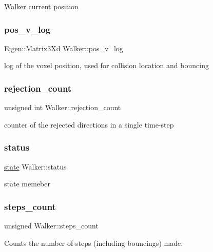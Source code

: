 \hyperlink{class_walker}{Walker} current position \mbox{\label{class_walker_a62d99cc92226681123be94e64fb2bf7b}} 
\subsubsection{\texorpdfstring{pos\+\_\+v\+\_\+log}{pos\_v\_log}}
{\footnotesize\ttfamily Eigen\+::\+Matrix3\+Xd Walker\+::pos\+\_\+v\+\_\+log}

log of the voxel position, used for collision location and bouncing \mbox{\label{class_walker_a38669698192d39146c77011b69b1e372}} 
\subsubsection{\texorpdfstring{rejection\+\_\+count}{rejection\_count}}
{\footnotesize\ttfamily unsigned int Walker\+::rejection\+\_\+count}

counter of the rejected directions in a single time-\/step \mbox{\label{class_walker_afa37629b74387435a0bb02e0c061a718}} 
\subsubsection{\texorpdfstring{status}{status}}
{\footnotesize\ttfamily \hyperlink{class_walker_afcad3f5c11d0bd045de22fb0347dc44c}{state} Walker\+::status}

state memeber \mbox{\label{class_walker_a83536011f160b42f6c39f121ee550731}} 
\subsubsection{\texorpdfstring{steps\+\_\+count}{steps\_count}}
{\footnotesize\ttfamily unsigned Walker\+::steps\+\_\+count}

Counts the number of steps (including bouncings) made. \mbox{\label{class_walker_a7f33d06b7aa5fabf2a2ac15d119bbcc7}} 
